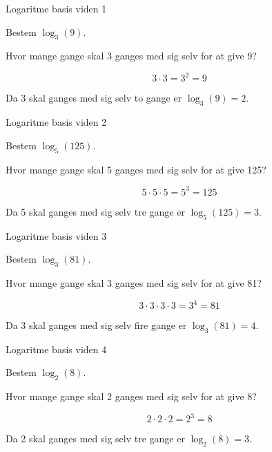 \documentclass{article}
\begin{document}
\tableofcontents
\newpage

\begin{exercise}{Logaritme basis viden 1}

Bestem $\log_{3}(9)$.


\hint
Hvor mange gange skal 3 ganges med sig selv for at give 9?

\hint
\[
3 \cdot 3 = 3^2 = 9
\]

\hint
Da 3 skal ganges med sig selv to gange er
$\log_3(9) = 2$.

\end{exercise}

\newpage


\begin{exercise}{Logaritme basis viden 2}

Bestem $\log_{5}(125)$.


\hint
Hvor mange gange skal 5 ganges med sig selv for at give 125?

\hint
\[
5 \cdot 5 \cdot 5 = 5^3 = 125
\]

\hint
Da 5 skal ganges med sig selv tre gange er
$\log_5(125) = 3$.

\end{exercise}

\newpage


\begin{exercise}{Logaritme basis viden 3}

Bestem $\log_{3}(81)$.


\hint
Hvor mange gange skal 3 ganges med sig selv for at give 81?

\hint
\[
3 \cdot 3 \cdot 3 \cdot 3 = 3^4 = 81
\]

\hint
Da 3 skal ganges med sig selv fire gange er
$\log_3(81) = 4$.

\end{exercise}

\newpage


\begin{exercise}{Logaritme basis viden 4}

Bestem $\log_{2}(8)$.


\hint
Hvor mange gange skal 2 ganges med sig selv for at give 8?

\hint
\[
2 \cdot 2 \cdot 2 = 2^3 = 8
\]

\hint
Da 2 skal ganges med sig selv tre gange er
$\log_2(8) = 3$.

\end{exercise}
\end{document}
